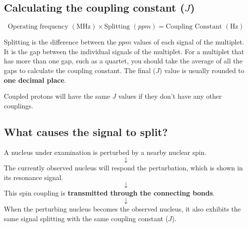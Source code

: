 \documentclass[11pt]{article}
\begin{document}
\subsection{Calculating the coupling constant (\(J\))}
\label{sec:orgaea10d7}
\[\text{Operating frequency } (\si{\mega\hertz}) \times \text{Splitting } (\si{ppm}) = \text{Coupling Constant } (\si{\hertz})\]

Splitting is the difference between the \(\si{ppm}\) values of each signal of the multiplet. It is the gap between the individual signals of the multiplet. For a multiplet that has more than one gap, such as a quartet, you should take the average of all the gaps to calculate the coupling constant. The final (\(J\)) value is usually rounded to \textbf{one decimal place}.

Coupled protons will have the same \(J\) values if they don't have any other couplings.

\newpage
\subsection{What causes the signal to split?}
\label{sec:orgec842a8}
A nucleus under examination is perturbed by a nearby nuclear spin.
\[\downarrow\]
The currently observed nucleus will respond the perturbation, which is shown in its resonance signal.
\[\downarrow\]
This spin coupling is \textbf{transmitted through the connecting bonds}.
\[\downarrow\]
When the perturbing nucleus becomes the observed nucleus, it also exhibits the same signal splitting with the same coupling constant (\(J\)).
\end{document}
